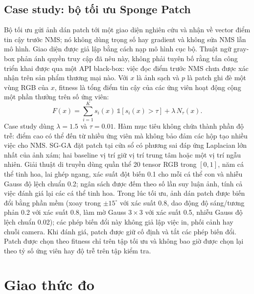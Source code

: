 \documentclass[a4paper,fleqn]{cas-dc}
\newcommand{\Ntau}{N_{\tau}}
\begin{document}
\subsection{Case study: bộ tối ưu Sponge Patch}
Bộ tối ưu gửi ảnh dán patch tới một giao diện nghiên cứu và nhận về vector điểm tin cậy trước NMS; nó không dùng trọng số hay gradient và không sửa NMS lẫn mô hình. Giao diện được giả lập bằng cách nạp mô hình cục bộ. Thuật ngữ gray-box phản ánh quyền truy cập đã nêu này, không phải tuyên bố rằng tấn công triển khai được qua một API black-box: việc đọc điểm trước NMS chưa được xác nhận trên sản phẩm thương mại nào. Với $x$ là ảnh sạch và $p$ là patch ghi đè một vùng RGB của $x$, fitness là tổng điểm tin cậy của các ứng viên hoạt động cộng một phần thưởng trên số ứng viên:
\begin{equation}
F(x)=\sum_{i=1}^{K} s_i(x)\,\mathbb{1}[s_i(x)>\tau]+\lambda\,\Ntau(x) .
\end{equation}
Case study dùng $\lambda=1.5$ và $\tau=0.01$.
Hàm mục tiêu không chứa thành phần độ trễ: điểm cao có thể đến từ nhiều ứng viên mà không bảo đảm các hộp tạo nhiều việc cho NMS. SG-GA đặt patch tại cửa sổ có phương sai đáp ứng Laplacian lớn nhất của ảnh xám; hai baseline vị trí giữ vị trí trung tâm hoặc một vị trí ngẫu nhiên. Giải thuật di truyền dùng quần thể 20 tensor RGB trong $[0,1]$, năm cá thể tinh hoa, lai ghép ngang, xác suất đột biến 0.1 cho mỗi cá thể con và nhiễu Gauss độ lệch chuẩn 0.2; ngân sách được đếm theo số lần suy luận ảnh, tính cả việc đánh giá lại các cá thể tinh hoa. Trong lúc tối ưu, ảnh dán patch được biến đổi bằng phần mềm (xoay trong $\pm15^{\circ}$ với xác suất 0.8, dao động độ sáng/tương phản 0.2 với xác suất 0.8, làm mờ Gauss $3\times3$ với xác suất 0.5, nhiễu Gauss độ lệch chuẩn 0.02); các phép biến đổi này không giả lập việc in, phối cảnh hay chuỗi camera. Khi đánh giá, patch được giữ cố định và tắt các phép biến đổi. Patch được chọn theo fitness chỉ trên tập tối ưu và không bao giờ được chọn lại theo tỷ số ứng viên hay độ trễ trên tập kiểm tra.

\section{Giao thức đo}
\label{sec:protocol}
\end{document}
